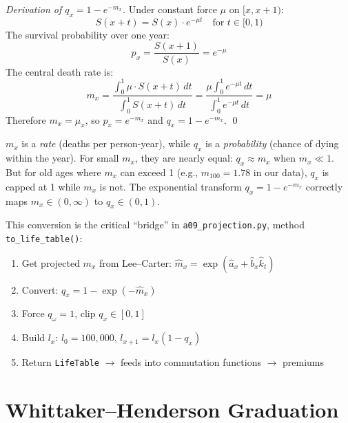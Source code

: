 \documentclass[11pt,a4paper]{article}
\theoremstyle{definition}
\begin{document}
\begin{proof}[Derivation of $q_x = 1 - e^{-m_x}$]
Under constant force $\mu$ on $[x, x+1)$:
\[
  S(x+t) = S(x) \cdot e^{-\mu t} \quad \text{for } t \in [0,1)
\]
The survival probability over one year:
\[
  p_x = \frac{S(x+1)}{S(x)} = e^{-\mu}
\]
The central death rate is:
\[
  m_x = \frac{\int_0^1 \mu \cdot S(x+t)\,dt}{\int_0^1 S(x+t)\,dt}
  = \frac{\mu \int_0^1 e^{-\mu t}\,dt}{\int_0^1 e^{-\mu t}\,dt}
  = \mu
\]
Therefore $m_x = \mu_x$, so $p_x = e^{-m_x}$ and $q_x = 1 - e^{-m_x}$. \qed
\end{proof}

\begin{intuition}
$m_x$ is a \emph{rate} (deaths per person-year), while $q_x$ is a
\emph{probability} (chance of dying within the year). For small $m_x$,
they are nearly equal: $q_x \approx m_x$ when $m_x \ll 1$.
But for old ages where $m_x$ can exceed 1 (e.g., $m_{100} = 1.78$ in our
data), $q_x$ is capped at 1 while $m_x$ is not. The exponential transform
$q_x = 1 - e^{-m_x}$ correctly maps $m_x \in (0, \infty)$ to $q_x \in (0, 1)$.
\end{intuition}

\begin{application}
This conversion is the critical ``bridge'' in \texttt{a09\_projection.py},
method \texttt{to\_life\_table()}:
\begin{enumerate}
  \item Get projected $m_x$ from Lee--Carter: $\hat{m}_x = \exp(\hat{a}_x + \hat{b}_x \hat{k}_t)$
  \item Convert: $q_x = 1 - \exp(-\hat{m}_x)$
  \item Force $q_\omega = 1$, clip $q_x \in [0,1]$
  \item Build $l_x$: $l_0 = 100{,}000$, $l_{x+1} = l_x(1 - q_x)$
  \item Return \texttt{LifeTable} $\to$ feeds into commutation functions $\to$ premiums
\end{enumerate}
\end{application}

\section{Whittaker--Henderson Graduation}
\label{sec:graduation}
\end{document}
